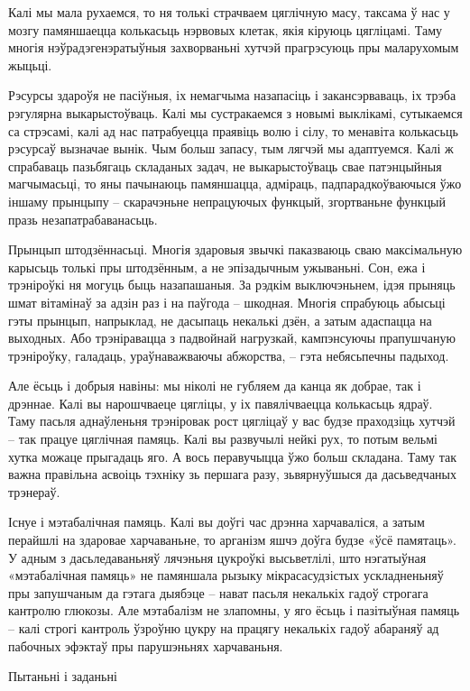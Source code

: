 Калі мы мала рухаемся, то ня толькі страчваем цяглічную масу, таксама ў нас у мозгу памяншаецца колькасьць нэрвовых клетак, якія кіруюць цягліцамі. Таму многія нэўрадэгенэратыўныя захворваньні хутчэй прагрэсуюць пры маларухомым жыцьці.

Рэсурсы здароўя не пасіўныя, іх немагчыма назапасіць і закансэрваваць, іх трэба рэгулярна выкарыстоўваць. Калі мы сустракаемся з новымі выклікамі, сутыкаемся са стрэсамі, калі ад нас патрабуецца праявіць волю і сілу, то менавіта колькасьць рэсурсаў вызначае вынік. Чым больш запасу, тым лягчэй мы адаптуемся. Калі ж спрабаваць пазьбягаць складаных задач, не выкарыстоўваць свае патэнцыйныя магчымасьці, то яны пачынаюць памяншацца, адміраць, падпарадкоўваючыся ўжо іншаму прынцыпу – скарачэньне непрацуючых функцый, згортваньне функцый празь незапатрабаванасьць.

Прынцып штодзённасьці. Многія здаровыя звычкі паказваюць сваю максімальную карысьць толькі пры штодзённым, а не эпізадычным ужываньні. Сон, ежа і трэніроўкі ня могуць быць назапашаныя. За рэдкім выключэньнем, ідэя прыняць шмат вітамінаў за адзін раз і на паўгода – шкодная. Многія спрабуюць абысьці гэты прынцып, напрыклад, не дасыпаць некалькі дзён, а затым адаспацца на выходных. Або трэніравацца з падвойнай нагрузкай, кампэнсуючы прапушчаную трэніроўку, галадаць, ураўнаважваючы абжорства, -- гэта небясьпечны падыход.

Але ёсьць і добрыя навіны: мы ніколі не губляем да канца як добрае, так і дрэннае. Калі вы нарошчваеце цягліцы, у іх павялічваецца колькасьць ядраў. Таму пасьля аднаўленьня трэніровак рост цягліцаў у вас будзе праходзіць хутчэй – так працуе цяглічная памяць. Калі вы развучылі нейкі рух, то потым вельмі хутка можаце прыгадаць яго. А вось перавучыцца ўжо больш складана. Таму так важна правільна асвоіць тэхніку зь першага разу, зьвярнуўшыся да дасьведчаных трэнераў.

Існуе і мэтабалічная памяць. Калі вы доўгі час дрэнна харчаваліся, а затым перайшлі на здаровае харчаваньне, то арганізм яшчэ доўга будзе «ўсё памятаць». У адным з дасьледаваньняў лячэньня цукроўкі высьветлілі, што нэгатыўная «мэтабалічная памяць» не памяншала рызыку мікрасасудзістых ускладненьняў пры запушчаным да гэтага дыябэце – нават пасьля некалькіх гадоў строгага кантролю глюкозы. Але мэтабалізм не злапомны, у яго ёсьць і пазітыўная памяць – калі строгі кантроль ўзроўню цукру на працягу некалькіх гадоў абараняў ад пабочных эфэктаў пры парушэньнях харчаваньня.

Пытаньні і заданьні

